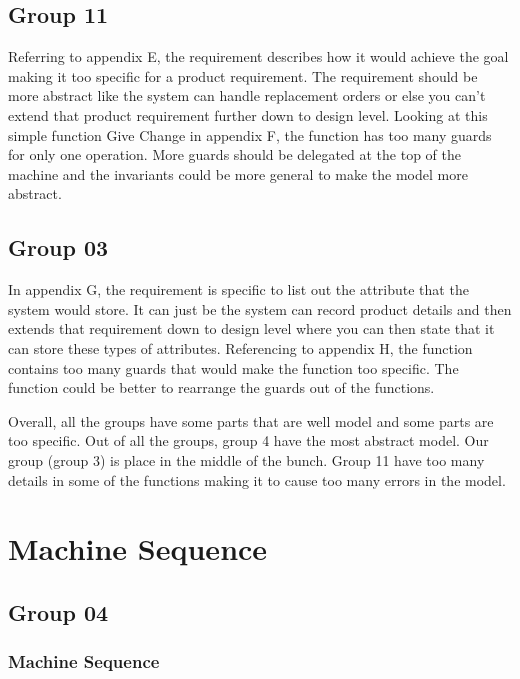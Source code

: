 \subsection{Group 11}
\label{group11}

Referring to appendix E, the requirement describes how it would achieve the goal making it too specific for a product requirement. The requirement should be more abstract like the system can handle replacement orders or else you can’t extend that product requirement further down to design level. Looking at this simple function Give Change in appendix F, the function has too many guards for only one operation. More guards should be delegated at the top of the machine and the invariants could be more general to make the model more abstract.

\subsection{Group 03}
\label{group03}

In appendix G, the requirement is specific to list out the attribute that the system would store. It can just be the system can record product details and then extends that requirement down to design level where you can then state that it can store these types of attributes. Referencing to appendix H, the function contains too many guards that would make the function too specific. The function could be better to rearrange the guards out of the functions. 

Overall, all the groups have some parts that are well model and some parts are too specific. Out of all the groups, group 4 have the most abstract model. Our group (group 3) is place in the middle of the bunch. Group 11 have too many details in some of the functions making it to cause too many errors in the model. 

\section{Machine Sequence}
\label{machinesequence}

\subsection{Group 04}
\label{group04}

\subsubsection{Machine Sequence}
\label{machinesequence}

